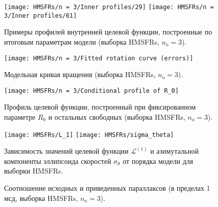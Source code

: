 \documentclass{beamer}
\begin{document}
\begin{frame}
\begin{figure}
  \centering
  \texttt{[image: HMSFRs/n = 3/Inner profiles/29]}
  \texttt{[image: HMSFRs/n = 3/Inner profiles/61]}
  \caption{Примеры профилей внутренней целевой функции, построенные по итоговым параметрам модели (выборка HMSFRs, $ n_\mathrm{o} = 3 $).}
\end{figure}
\end{frame}

\begin{frame}
\vspace{-0.6em}

\end{frame}

\begin{frame}
\begin{figure}
  \centering
  \texttt{[image: HMSFRs/n = 3/Fitted rotation curve (errors)]}
  \caption{Модельная кривая вращения (выборка HMSFRs, $ n_\mathrm{o} = 3 $).}
\end{figure}
\end{frame}

\begin{frame}
\begin{figure}
  \centering
  \texttt{[image: HMSFRs/n = 3/Conditional profile of R\_0]}
  \caption{Профиль целевой функции, построенный при фиксированном параметре $ R_0 $ и остальных свободных (выборка HMSFRs, $ n_\mathrm{o} = 3 $).}
\end{figure}
\end{frame}

\begin{frame}
\begin{figure}
  \centering
  \texttt{[image: HMSFRs/L\_1]}
  \texttt{[image: HMSFRs/sigma\_theta]}
  \caption{Зависимость значений целевой функции $ \mathcal{L}^{(1)} $ и азимутальной компоненты эллипсоида скоростей $ \sigma_\theta $ от порядка модели для выборки HMSFRs.}
\end{figure}
\end{frame}

\begin{frame}
\begin{figure}
  \centering
  \subfloat{{\texttt{[image: HMSFRs/n = 3/Parallaxes (under 1 mas)]}}}
  \caption{Соотношение исходных и приведенных параллаксов (в пределах 1 мсд, выборка HMSFRs, $ n_\mathrm{o} = 3$).}
\end{figure}
\end{frame}
\end{document}
